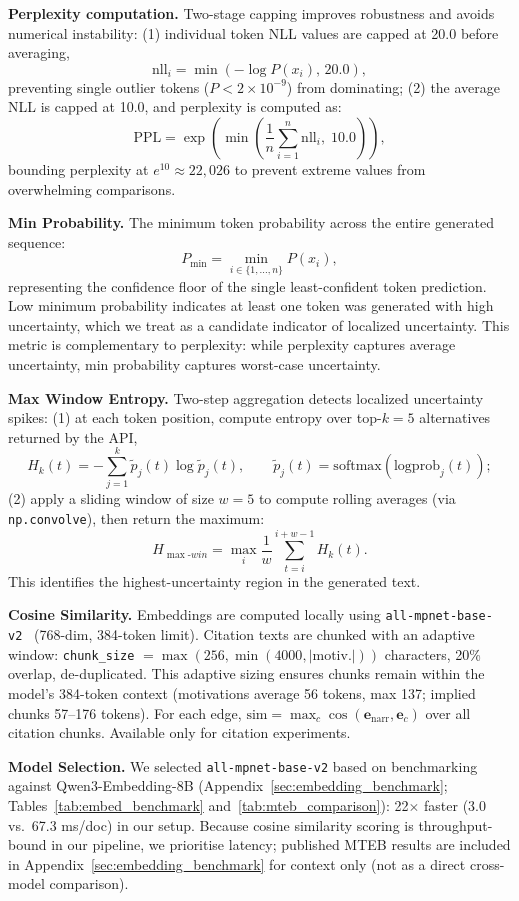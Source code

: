 \noindent\textbf{Perplexity computation.} Two-stage capping improves robustness and avoids numerical instability: (1) individual token NLL values are capped at 20.0 before averaging,
\[
\mathrm{nll}_i=\min\!\left(-\log P(x_i),\,20.0\right),
\]
preventing single outlier tokens (\(P<2\times 10^{-9}\)) from dominating; (2) the average NLL is capped at 10.0, and perplexity is computed as:
\[
\mathrm{PPL} = \exp\!\left(\min\!\left(\frac{1}{n}\sum_{i=1}^{n}\mathrm{nll}_i,\;10.0\right)\right),
\]
bounding perplexity at \(e^{10}\approx 22{,}026\) to prevent extreme values from overwhelming comparisons.

\noindent\textbf{Min Probability.} The minimum token probability across the entire generated sequence:
\[
P_{\min} = \min_{i \in \{1,\ldots,n\}} P(x_i),
\]
representing the confidence floor of the single least-confident token prediction. Low minimum probability indicates at least one token was generated with high uncertainty, which we treat as a candidate indicator of localized uncertainty. This metric is complementary to perplexity: while perplexity captures average uncertainty, min probability captures worst-case uncertainty.

\noindent\textbf{Max Window Entropy.} Two-step aggregation detects localized uncertainty spikes: (1) at each token position, compute entropy over top-\(k{=}5\) alternatives returned by the API,
\[
H_k(t)=-\sum_{j=1}^{k}\tilde{p}_j(t)\log \tilde{p}_j(t),
\qquad
\tilde{p}_j(t)=\mathrm{softmax}(\mathrm{logprob}_j(t));
\]
(2) apply a sliding window of size \(w{=}5\) to compute rolling averages (via \texttt{np.convolve}), then return the maximum:
\[
H_{\max\text{-}win}=\max_{i}\frac{1}{w}\sum_{t=i}^{i+w-1} H_k(t).
\]
This identifies the highest-uncertainty region in the generated text.

\noindent\textbf{Cosine Similarity.}
\label{sec:uq_cossim}
Embeddings are computed locally using \texttt{all-mpnet-base-v2}~\cite{muennighoff2023mteb} (768-dim, 384-token limit). Citation texts are chunked with an adaptive window: \texttt{chunk\_size} \(=\max(256,\min(4000,|\text{motiv.}|))\) characters, 20\% overlap, de-duplicated. This adaptive sizing ensures chunks remain within the model's 384-token context (motivations average 56 tokens, max 137; implied chunks 57--176 tokens). For each edge, \(\mathrm{sim}=\max_c \cos(\mathbf{e}_{\mathrm{narr}},\mathbf{e}_c)\) over all citation chunks. Available only for citation experiments.

\noindent\textbf{Model Selection.} We selected \texttt{all-mpnet-base-v2} based on benchmarking against Qwen3-Embedding-8B (Appendix~\ref{sec:embedding_benchmark}; Tables~\ref{tab:embed_benchmark} and~\ref{tab:mteb_comparison}): 22$\times$ faster (3.0 vs.\ 67.3 ms/doc) in our setup. Because cosine similarity scoring is throughput-bound in our pipeline, we prioritise latency; published MTEB results are included in Appendix~\ref{sec:embedding_benchmark} for context only (not as a direct cross-model comparison).

